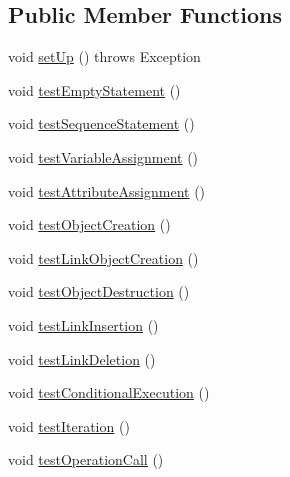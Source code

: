 \subsection*{Public Member Functions}
\begin{DoxyCompactItemize}
\item 
void \hyperlink{classorg_1_1tzi_1_1use_1_1parser_1_1soil_1_1_statement_generation_test_a3a264958629da8576bac2c165a987940}{set\-Up} ()  throws Exception 
\item 
void \hyperlink{classorg_1_1tzi_1_1use_1_1parser_1_1soil_1_1_statement_generation_test_abf6def6db36549fd099a09212a443f57}{test\-Empty\-Statement} ()
\item 
void \hyperlink{classorg_1_1tzi_1_1use_1_1parser_1_1soil_1_1_statement_generation_test_adb348d9e717db6c3a23360e507e86fb4}{test\-Sequence\-Statement} ()
\item 
void \hyperlink{classorg_1_1tzi_1_1use_1_1parser_1_1soil_1_1_statement_generation_test_a7c7684a38481a8f1a88018cfb0a399a5}{test\-Variable\-Assignment} ()
\item 
void \hyperlink{classorg_1_1tzi_1_1use_1_1parser_1_1soil_1_1_statement_generation_test_af2b1e3e8cc0aa71eef5c5fdbb2c49011}{test\-Attribute\-Assignment} ()
\item 
void \hyperlink{classorg_1_1tzi_1_1use_1_1parser_1_1soil_1_1_statement_generation_test_a692ce34ac3ace080833b3eb6d46868bf}{test\-Object\-Creation} ()
\item 
void \hyperlink{classorg_1_1tzi_1_1use_1_1parser_1_1soil_1_1_statement_generation_test_a30fbbf0e4bf2ff68aa04e9a469a3cf85}{test\-Link\-Object\-Creation} ()
\item 
void \hyperlink{classorg_1_1tzi_1_1use_1_1parser_1_1soil_1_1_statement_generation_test_afe9818a25cc4b9305984a7a7d7c6aefc}{test\-Object\-Destruction} ()
\item 
void \hyperlink{classorg_1_1tzi_1_1use_1_1parser_1_1soil_1_1_statement_generation_test_a6321a4b07872988b0f9beece8a8b23d8}{test\-Link\-Insertion} ()
\item 
void \hyperlink{classorg_1_1tzi_1_1use_1_1parser_1_1soil_1_1_statement_generation_test_a105410cbe566cdbc405890f3995a5b5c}{test\-Link\-Deletion} ()
\item 
void \hyperlink{classorg_1_1tzi_1_1use_1_1parser_1_1soil_1_1_statement_generation_test_afff87fb528bcde005f66960d47eb6d21}{test\-Conditional\-Execution} ()
\item 
void \hyperlink{classorg_1_1tzi_1_1use_1_1parser_1_1soil_1_1_statement_generation_test_af49f485925281836e9a2540e5df0f4d0}{test\-Iteration} ()
\item 
void \hyperlink{classorg_1_1tzi_1_1use_1_1parser_1_1soil_1_1_statement_generation_test_a66d098abe29f4f8fa11f8e873d016dfc}{test\-Operation\-Call} ()
\end{DoxyCompactItemize}


